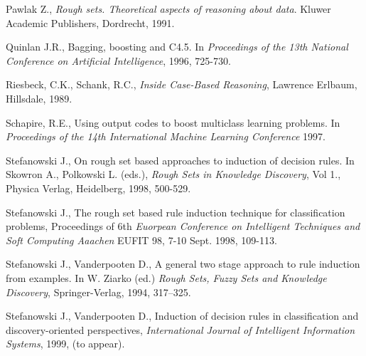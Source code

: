 \documentclass{article}
\begin{document}
\begin{thebibliography}{99}
  Pawlak Z., {\em Rough sets. Theoretical aspects of
reasoning about data}. Kluwer Academic Publishers, Dordrecht, 1991.


  Quinlan J.R., Bagging, boosting and C4.5. In {\em Proceedings
of the 13th National Conference on Artificial Intelligence}, 1996,
725-730.

  Riesbeck, C.K., Schank, R.C., {\em Inside Case-Based
Reasoning}, Lawrence Erlbaum, Hillsdale, 1989.

  Schapire, R.E., Using output codes to boost multiclass
learning problems. In {\em Proceedings of the 14th International
Machine Learning Conference} 1997.



  Stefanowski J.,  On rough set based approaches to
induction of decision rules. In Skowron A., Polkowski L. (eds.),
{\em Rough Sets in Knowledge Discovery}, Vol 1., Physica Verlag,
Heidelberg, 1998, 500-529.

  Stefanowski J., The rough set based rule induction
technique for classification problems, Proceedings of 6th {\em
Euorpean Conference on Intelligent Techniques and Soft Computing
Aaachen} EUFIT 98, 7-10 Sept. 1998, 109-113.

  Stefanowski J., Vanderpooten D.,  A general two stage
approach to rule induction from examples. In W. Ziarko (ed.) {\em Rough
Sets, Fuzzy Sets and Knowledge Discovery}, Springer-Verlag, 1994, 317--325.

  Stefanowski J., Vanderpooten D., Induction of decision rules
in classification and discovery-oriented perspectives, {\em
International Journal of Intelligent Information Systems}, 1999,
(to appear).


\end{thebibliography}
\end{document}
